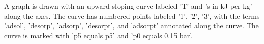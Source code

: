 A graph is drawn with an upward sloping curve labeled 'T' and 's in kJ per kg' along the axes. The curve has numbered points labeled '1', '2', '3', with the terms 'adsol', 'desorp', 'adsorp', 'desorpt', and 'adsorpt' annotated along the curve. The curve is marked with 'p5 equals p5' and 'p0 equals 0.15 bar'.